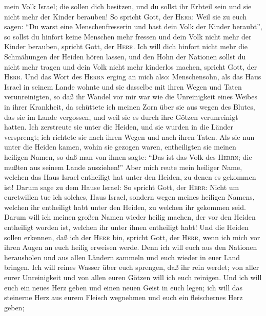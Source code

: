 mein Volk Israel; die sollen dich besitzen, und du sollst ihr Erbteil
sein und sie nicht mehr der Kinder berauben!  So spricht
Gott, der \textsc{Herr}: Weil sie zu euch sagen: ``Du warst eine
Menschenfresserin und hast dein Volk der Kinder beraubt'',
 so sollst du hinfort keine Menschen mehr fressen und
dein Volk nicht mehr der Kinder berauben, spricht Gott, der
\textsc{Herr}.  Ich will dich hinfort nicht mehr die
Schmähungen der Heiden hören lassen, und den Hohn der Nationen sollst du
nicht mehr tragen und dein Volk nicht mehr kinderlos machen, spricht
Gott, der \textsc{Herr}.  Und das Wort des \textsc{Herrn}
erging an mich also:  Menschensohn, als das Haus Israel
in seinem Lande wohnte und sie dasselbe mit ihren Wegen und Taten
verunreinigten, so daß ihr Wandel vor mir war wie die Unreinigkeit eines
Weibes in ihrer Krankheit,  da schüttete ich meinen Zorn
über sie aus wegen des Blutes, das sie im Lande vergossen, und weil sie
es durch ihre Götzen verunreinigt hatten.  Ich zerstreute
sie unter die Heiden, und sie wurden in die Länder versprengt; ich
richtete sie nach ihren Wegen und nach ihren Taten.  Als
sie nun unter die Heiden kamen, wohin sie gezogen waren, entheiligten
sie meinen heiligen Namen, so daß man von ihnen sagte: ``Das ist das
Volk des \textsc{Herrn}; die mußten aus seinem Lande ausziehen!''
 Aber mich reute mein heiliger Name, welchen das Haus
Israel entheiligt hat unter den Heiden, zu denen es gekommen ist!
 Darum sage zu dem Hause Israel: So spricht Gott, der
\textsc{Herr}: Nicht um euretwillen tue ich solches, Haus Israel,
sondern wegen meines heiligen Namens, welchen ihr entheiligt habt unter
den Heiden, zu welchen ihr gekommen seid.  Darum will ich
meinen großen Namen wieder heilig machen, der vor den Heiden entheiligt
worden ist, welchen ihr unter ihnen entheiligt habt! Und die Heiden
sollen erkennen, daß ich der \textsc{Herr} bin, spricht Gott, der
\textsc{Herr}, wenn ich mich vor ihren Augen an euch heilig erweisen
werde.  Denn ich will euch aus den Nationen herausholen
und aus allen Ländern sammeln und euch wieder in euer Land bringen.
 Ich will reines Wasser über euch sprengen, daß ihr rein
werdet; von aller eurer Unreinigkeit und von allen euren Götzen will ich
euch reinigen.  Und ich will euch ein neues Herz geben
und einen neuen Geist in euch legen; ich will das steinerne Herz aus
eurem Fleisch wegnehmen und euch ein fleischernes Herz geben;
